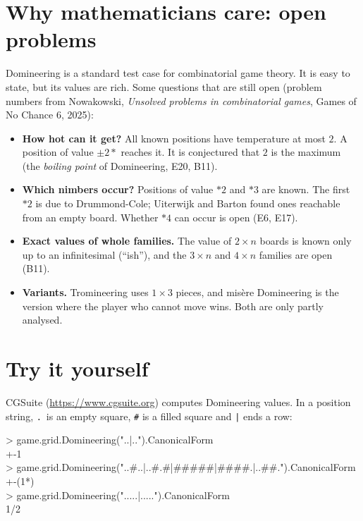 \documentclass[11pt,a4paper]{article}
\begin{document}
\section{Why mathematicians care: open problems}

Domineering is a standard test case for combinatorial game theory.  It is easy to state, but
its values are rich.  Some questions that are still open (problem numbers from Nowakowski,
\emph{Unsolved problems in combinatorial games}, Games of No Chance 6, 2025):

\begin{itemize}
  \item \textbf{How hot can it get?}  All known positions have temperature at most $2$.  A
        position of value $\pm2*$ reaches it.  It is conjectured that $2$ is the maximum (the
        \emph{boiling point} of Domineering, E20, B11).
  \item \textbf{Which nimbers occur?}  Positions of value $*2$ and $*3$ are known.  The first
        $*2$ is due to Drummond-Cole; Uiterwijk and Barton found ones reachable from an empty
        board.  Whether $*4$ can occur is open (E6, E17).
  \item \textbf{Exact values of whole families.}  The value of $2\times n$ boards is known only up
        to an infinitesimal (``ish''), and the $3\times n$ and $4\times n$ families are open
        (B11).
  \item \textbf{Variants.}  Tromineering uses $1\times3$ pieces, and misère Domineering is the
        version where the player who cannot move wins.  Both are only partly analysed.
\end{itemize}

\section{Try it yourself}

CGSuite (\url{https://www.cgsuite.org}) computes Domineering values.  In a position string,
\texttt{.}\ is an empty square, \texttt{\#} is a filled square and \texttt{|} ends a row:

\begin{keybox}
\small\ttfamily
> game.grid.Domineering("..|..").CanonicalForm\\
+-1\\
> game.grid.Domineering("..\#..|..\#.\#|\#\#\#\#\#|\#\#\#\#.|..\#\#.").CanonicalForm\\
+-(1*)\\
> game.grid.Domineering(".....|.....").CanonicalForm\\
1/2
\end{keybox}
\end{document}
